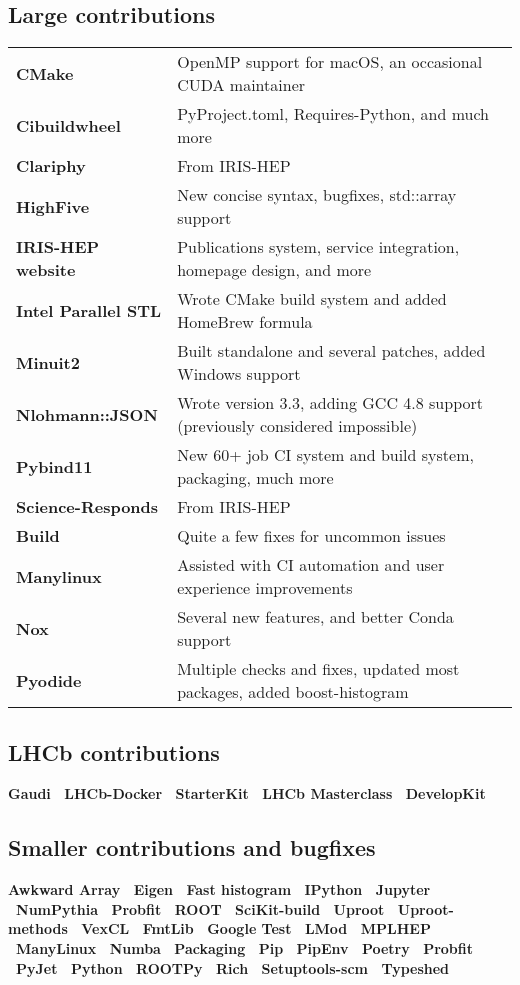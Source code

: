 \documentclass[10pt,letterpaper]{moderncv}
\begin{document}
\subsection{Large contributions}
\begin{tabularx}{\textwidth}{>{\bfseries}p{1.4in}X}
	CMake          & OpenMP support for macOS, an occasional CUDA maintainer  \\
	Cibuildwheel   & PyProject.toml, Requires-Python, and much more \\
	Clariphy         & From IRIS-HEP \\
	HighFive       & New concise syntax, bugfixes, std::array support  \\
	IRIS-HEP website & Publications system, service integration, homepage design, and more \\
	Intel Parallel STL & Wrote CMake build system and added HomeBrew formula \\
	Minuit2        & Built standalone and several patches, added Windows support \\
	Nlohmann::JSON & Wrote version 3.3, adding GCC 4.8 support (previously considered impossible) \\
	Pybind11       & New 60+ job CI system and build system, packaging, much more \\
	Science-Responds & From IRIS-HEP \\
    Build          & Quite a few fixes for uncommon issues \\
    Manylinux & Assisted with CI automation and user experience improvements \\
    Nox            & Several new features, and better Conda support \\
    Pyodide        & Multiple checks and fixes, updated most packages, added boost-histogram \\
\end{tabularx}

\subsection{LHCb contributions}
\textbf{%
	Gaudi \textbullet\
	LHCb-Docker \textbullet\
	StarterKit \textbullet\
	LHCb Masterclass \textbullet\
	DevelopKit
}

\subsection{Smaller contributions and bugfixes}
\textbf{%
	Awkward Array \textbullet\
	Eigen  \textbullet\
	Fast histogram \textbullet\
	IPython \textbullet\
	Jupyter \textbullet\
	NumPythia \textbullet\
	Probfit  \textbullet\
	ROOT \textbullet\
	SciKit-build \textbullet\
	Uproot  \textbullet\
	Uproot-methods \textbullet\
	VexCL \textbullet\
    FmtLib \textbullet\
    Google Test  \textbullet\
    LMod \textbullet\
    MPLHEP \textbullet\
    ManyLinux \textbullet\
    Numba \textbullet\
    Packaging \textbullet\
    Pip \textbullet\
    PipEnv \textbullet\
    Poetry \textbullet\
    Probfit \textbullet\
    PyJet \textbullet\
    Python \textbullet\
    ROOTPy \textbullet\
    Rich \textbullet\
    Setuptools-scm \textbullet\
    Typeshed
}
\end{document}
